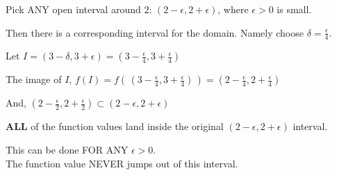 \documentclass{ximera}
\begin{document}
Pick ANY open interval around $2$:  $(2 - \epsilon, 2 + \epsilon)$, where $\epsilon > 0 $ is small. 

Then there is a corresponding interval for the domain. Namely choose $\delta = \frac{\epsilon}{4}$.

Let $I = (3 - \delta, 3 + \epsilon) = \left(3 - \frac{\epsilon}{4}, 3 + \frac{\epsilon}{4}\right)$


The image of $I$, $f(I) = f\left(\,\left(3 - \frac{\epsilon}{4}, 3 + \frac{\epsilon}{4}\right)\,\right) = \left(2 - \frac{\epsilon}{4}, 2 + \frac{\epsilon}{4}\right)$

And, $\left(2 - \frac{\epsilon}{2}, 2 + \frac{\epsilon}{2}\right) \subset  (2 - \epsilon, 2 + \epsilon) $


\textbf{ALL} of the function values land inside the original $(2 - \epsilon, 2 + \epsilon)$ interval.


This can be done FOR ANY $\epsilon > 0$. \\


The function value NEVER jumps out of this interval.
\end{document}
